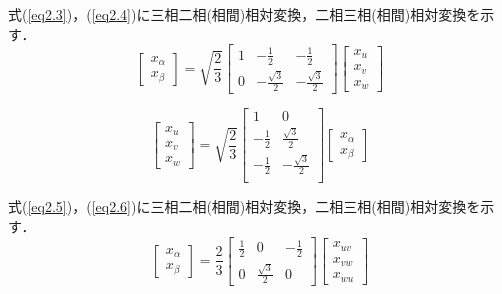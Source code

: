 式(\ref{eq2.3})，(\ref{eq2.4})に三相二相(相間)相対変換，二相三相(相間)相対変換を示す．
\begin{equation}
    \begin{bmatrix} \label{eq2.3}
        x_{\alpha} \\
        x_{\beta}
    \end{bmatrix}
    =\sqrt{\frac{2}{3}}
    \begin{bmatrix}
        1 & -\frac{1}{2} & -\frac{1}{2} \\
        0 & -\frac{\sqrt{3}}{2} & -\frac{\sqrt{3}}{2}
    \end{bmatrix}
    \begin{bmatrix}
        x_{u}\\
        x_{v}\\
        x_{w}
    \end{bmatrix}
\end{equation}

\begin{equation}
    \begin{bmatrix} \label{eq2.4}
        x_{u}\\
        x_{v}\\
        x_{w}
    \end{bmatrix}
    =\sqrt{\frac{2}{3}}
    \begin{bmatrix}
        1 & 0\\
        -\frac{1}{2} & \frac{\sqrt{3}}{2}\\
        -\frac{1}{2} & -\frac{\sqrt{3}}{2}\\
    \end{bmatrix}
    \begin{bmatrix}
        x_{\alpha} \\
        x_{\beta}
    \end{bmatrix}
\end{equation}

式(\ref{eq2.5})，(\ref{eq2.6})に三相二相(相間)相対変換，二相三相(相間)相対変換を示す．
\begin{equation}
    \begin{bmatrix} \label{eq2.5}
        x_{\alpha} \\
        x_{\beta}
    \end{bmatrix}
    =\frac{2}{3}
    \begin{bmatrix}
        \frac{1}{2} & 0 & -\frac{1}{2} \\
        0 & \frac{\sqrt{3}}{2} & 0
    \end{bmatrix}
    \begin{bmatrix}
        x_{uv}\\
        x_{vw}\\
        x_{wu}
    \end{bmatrix}
\end{equation}

